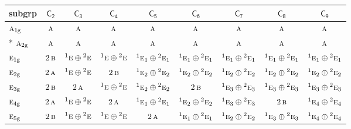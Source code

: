\documentclass[10pt,a4paper]{article}
\numberwithin{equation}{section}
\newcommand{\grp}[1]{\mathsf{#1}}
\newcommand{\irr}[1]{\text{\normalfont\scshape #1}}
\newcommand{\conjpair}[1]{{}^{#1}}
\newcommand{\ptag}[1]{\mathrm{#1}}
\begin{document}
{\small\begin{longtable}{@{}lcccccccc@{}}\toprule
subgrp & \href{C2.pdf}{$\grp{C_{2}}$} & \href{C3.pdf}{$\grp{C_{3}}$} & \href{C4.pdf}{$\grp{C_{4}}$} & \href{C5.pdf}{$\grp{C_{5}}$} & \href{C6.pdf}{$\grp{C_{6}}$} & \href{C7.pdf}{$\grp{C_{7}}$} & \href{C8.pdf}{$\grp{C_{8}}$} & \href{C9.pdf}{$\grp{C_{9}}$}\\\midrule\endhead
\bottomrule\endfoot\endlastfoot
$\irr{a}_{1\ptag{g}}$ & $\irr{a}$ & $\irr{a}$ & $\irr{a}$ & $\irr{a}$ & $\irr{a}$ & $\irr{a}$ & $\irr{a}$ & $\irr{a}$\\*
$\irr{a}_{2\ptag{g}}$ & $\irr{a}$ & $\irr{a}$ & $\irr{a}$ & $\irr{a}$ & $\irr{a}$ & $\irr{a}$ & $\irr{a}$ & $\irr{a}$\\
$\irr{e}_{1\ptag{g}}$ & $2\,\irr{b}$ & $\conjpair{1}\irr{e}\oplus \conjpair{2}\irr{e}$ & $\conjpair{1}\irr{e}\oplus \conjpair{2}\irr{e}$ & $\conjpair{1}\irr{e}_{1}\oplus \conjpair{2}\irr{e}_{1}$ & $\conjpair{1}\irr{e}_{1}\oplus \conjpair{2}\irr{e}_{1}$ & $\conjpair{1}\irr{e}_{1}\oplus \conjpair{2}\irr{e}_{1}$ & $\conjpair{1}\irr{e}_{1}\oplus \conjpair{2}\irr{e}_{1}$ & $\conjpair{1}\irr{e}_{1}\oplus \conjpair{2}\irr{e}_{1}$\\
$\irr{e}_{2\ptag{g}}$ & $2\,\irr{a}$ & $\conjpair{1}\irr{e}\oplus \conjpair{2}\irr{e}$ & $2\,\irr{b}$ & $\conjpair{1}\irr{e}_{2}\oplus \conjpair{2}\irr{e}_{2}$ & $\conjpair{1}\irr{e}_{2}\oplus \conjpair{2}\irr{e}_{2}$ & $\conjpair{1}\irr{e}_{2}\oplus \conjpair{2}\irr{e}_{2}$ & $\conjpair{1}\irr{e}_{2}\oplus \conjpair{2}\irr{e}_{2}$ & $\conjpair{1}\irr{e}_{2}\oplus \conjpair{2}\irr{e}_{2}$\\
$\irr{e}_{3\ptag{g}}$ & $2\,\irr{b}$ & $2\,\irr{a}$ & $\conjpair{1}\irr{e}\oplus \conjpair{2}\irr{e}$ & $\conjpair{1}\irr{e}_{2}\oplus \conjpair{2}\irr{e}_{2}$ & $2\,\irr{b}$ & $\conjpair{1}\irr{e}_{3}\oplus \conjpair{2}\irr{e}_{3}$ & $\conjpair{1}\irr{e}_{3}\oplus \conjpair{2}\irr{e}_{3}$ & $\conjpair{1}\irr{e}_{3}\oplus \conjpair{2}\irr{e}_{3}$\\
$\irr{e}_{4\ptag{g}}$ & $2\,\irr{a}$ & $\conjpair{1}\irr{e}\oplus \conjpair{2}\irr{e}$ & $2\,\irr{a}$ & $\conjpair{1}\irr{e}_{1}\oplus \conjpair{2}\irr{e}_{1}$ & $\conjpair{1}\irr{e}_{2}\oplus \conjpair{2}\irr{e}_{2}$ & $\conjpair{1}\irr{e}_{3}\oplus \conjpair{2}\irr{e}_{3}$ & $2\,\irr{b}$ & $\conjpair{1}\irr{e}_{4}\oplus \conjpair{2}\irr{e}_{4}$\\
$\irr{e}_{5\ptag{g}}$ & $2\,\irr{b}$ & $\conjpair{1}\irr{e}\oplus \conjpair{2}\irr{e}$ & $\conjpair{1}\irr{e}\oplus \conjpair{2}\irr{e}$ & $2\,\irr{a}$ & $\conjpair{1}\irr{e}_{1}\oplus \conjpair{2}\irr{e}_{1}$ & $\conjpair{1}\irr{e}_{2}\oplus \conjpair{2}\irr{e}_{2}$ & $\conjpair{1}\irr{e}_{3}\oplus \conjpair{2}\irr{e}_{3}$ & $\conjpair{1}\irr{e}_{4}\oplus \conjpair{2}\irr{e}_{4}$\\

\end{longtable}}
\end{document}
